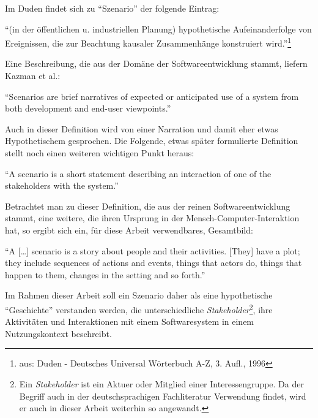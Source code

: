   Im Duden findet sich zu "`Szenario"' der folgende Eintrag:
  
  \begin{definition}\label{def:szenario_allg}
    "`(in der öffentlichen u. industriellen Planung) hypothetische Aufeinanderfolge von Ereignissen, die zur Beachtung kausaler Zusammenhänge konstruiert wird."'\footnote{aus: Duden - Deutsches Universal Wörterbuch A-Z, 3. Aufl., 1996}
  \end{definition}
  
  Eine Beschreibung, die aus der Domäne der Softwareentwicklung stammt, liefern Kazman et al.:
  
  \begin{definition}\label{def:szenario_kazman_et_al}
    "`Scenarios are brief narratives of expected or anticipated use of a system from both development and end-user viewpoints."' \emph{\citep[S. 2]{scenario_based_analysis_of_software_architecture}}
  \end{definition}
  
  Auch in dieser Definition wird von einer Narration und damit eher etwas Hypothetischem gesprochen. Die Folgende, etwas später formulierte Definition stellt noch einen weiteren wichtigen Punkt heraus:
  
  \begin{definition}\label{def:szenario_clements_et_al}
    "`A scenario is a short statement describing an interaction of one of the stakeholders with the system."' \emph{\citep[S. 33]{evaluating_software_architectures}}
  \end{definition}
  
  Betrachtet man zu dieser Definition, die aus der reinen Softwareentwicklung stammt, eine weitere, die ihren Ursprung in der Mensch-Computer-Interaktion hat, so ergibt sich ein, für diese Arbeit verwendbares, Gesamtbild:
  
  \begin{definition}\label{def:szenario_carroll_rosson}
    "`A [\ldots] scenario is a story about people and their activities. [They] have a plot; they include sequences of actions and events, things that actors do, things that happen to them, changes in the setting and so forth."' \emph{\citep[S. 16/18]{scenario_based_development}}
  \end{definition}
  
  Im Rahmen dieser Arbeit soll ein Szenario daher als eine hypothetische "`Geschichte"' verstanden werden, die unterschiedliche \emph{Stakeholder}\footnote{Ein \emph{Stakeholder} ist ein Aktuer oder Mitglied einer Interessengruppe. Da der Begriff auch in der deutschsprachigen Fachliteratur Verwendung findet, wird er auch in dieser Arbeit weiterhin so angewandt.}, ihre Aktivitäten und Interaktionen mit einem Softwaresystem in einem Nutzungskontext beschreibt.
  
